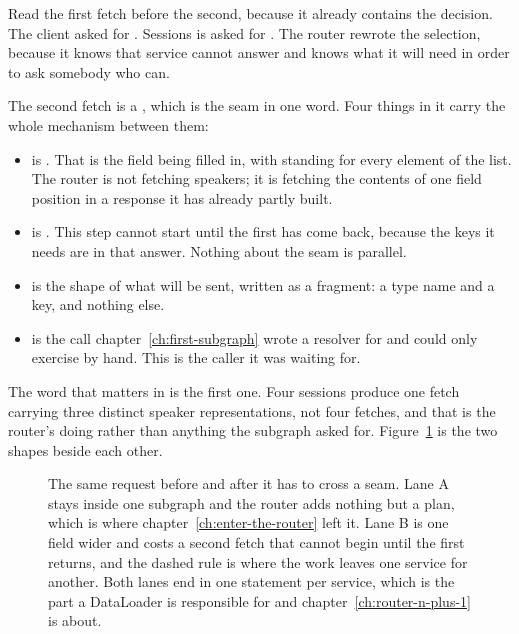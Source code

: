 %
Read the first fetch before the second, because it already contains the
decision. The client asked for . Sessions is asked for
. The router rewrote the selection, because
it knows that service cannot answer  and knows what it will need in
order to ask somebody who can.

%
The second fetch is a , which is the seam in one word. Four
things in it carry the whole mechanism between them:

\begin{itemize}
  \item {} is . That is the field being
        filled in, with  standing for every element of the list. The
        router is not fetching speakers; it is fetching the contents of one
        field position in a response it has already partly built.
  \item {} is \code{[0]}. This step cannot start until
        the first has come back, because the keys it needs are in that answer.
        Nothing about the seam is parallel.
  \item {} is the shape of what will be sent, written as a
        fragment: a type name and a key, and nothing else.
  \item {} is the  call
        chapter~\ref{ch:first-subgraph} wrote a resolver for and could only
        exercise by hand. This is the caller it was waiting for.
\end{itemize}

%
The word that matters in  is the first one. Four sessions
produce one fetch carrying three distinct speaker representations, not four fetches, and that is
the router's doing rather than anything the subgraph asked for.
Figure~\ref{fig:ch09-two-fetches} is the two shapes beside each other.

\begin{figure}[htbp]
  \centering
  
  \caption{The same request before and after it has to cross a seam. Lane A
  stays inside one subgraph and the router adds nothing but a plan, which is
  where chapter~\ref{ch:enter-the-router} left it. Lane B is one field wider
  and costs a second fetch that cannot begin until the first returns, and the
  dashed rule is where the work leaves one service for another. Both lanes end
  in one statement per service, which is the part a DataLoader is responsible
  for and chapter~\ref{ch:router-n-plus-1} is about.}
  \label{fig:ch09-two-fetches}
\end{figure}

